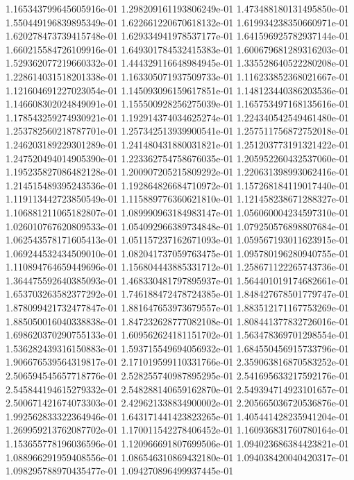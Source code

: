 1.165343799645605916e-01
1.298209161193806249e-01
1.473488180131495850e-01
1.550449196839895349e-01
1.622661220670618132e-01
1.619934238350660971e-01
1.620278473739415748e-01
1.629334941978537177e-01
1.641596925782937144e-01
1.660215584726109916e-01
1.649301784532415383e-01
1.600679681289316203e-01
1.529362077219660332e-01
1.444329116648984945e-01
1.335528640522280208e-01
1.228614031518201338e-01
1.163305071937509733e-01
1.116233852368021667e-01
1.121604691227023054e-01
1.145093096159617851e-01
1.148123440386203536e-01
1.146608302024849091e-01
1.155500928256275039e-01
1.165753497168135616e-01
1.178543259274930921e-01
1.192914374034625274e-01
1.224340542549461480e-01
1.253782560218787701e-01
1.257342513939900541e-01
1.257511756872752018e-01
1.246203189229301289e-01
1.241480431880031821e-01
1.251203773191321422e-01
1.247520494014905390e-01
1.223362754758676035e-01
1.205952260432537060e-01
1.195235827086482128e-01
1.200907205215809292e-01
1.220631398993062416e-01
1.214515489395243536e-01
1.192864826684710972e-01
1.157268184119017440e-01
1.119113442723850549e-01
1.115889776360621810e-01
1.121458238671288327e-01
1.106881211065182807e-01
1.089990963184983147e-01
1.056060004234597310e-01
1.026010767620809533e-01
1.054092966389734848e-01
1.079250576898807684e-01
1.062543578171605413e-01
1.051157237162671093e-01
1.059567193011623915e-01
1.069244532434509010e-01
1.082041737059763475e-01
1.095780196280940755e-01
1.110894764659449696e-01
1.156804443885331712e-01
1.258671122265743736e-01
1.364475592640385093e-01
1.468330481797895937e-01
1.564401019174682661e-01
1.653703263582377292e-01
1.746188472478724385e-01
1.848427678501779747e-01
1.878099421732477847e-01
1.881647653973679557e-01
1.883512171167753269e-01
1.885050016040338838e-01
1.847232628777082108e-01
1.808441377832726016e-01
1.698620370290755133e-01
1.609562624181151702e-01
1.563478369701298554e-01
1.536282439316150883e-01
1.593715549694056932e-01
1.684550456915733796e-01
1.906676539564319817e-01
2.171019599110331766e-01
2.359063816870583252e-01
2.506594545657718776e-01
2.528255740987895295e-01
2.541695633217592176e-01
2.545844194615279332e-01
2.548288140659162870e-01
2.549394714923101657e-01
2.500671421674073303e-01
2.429621338834900002e-01
2.205665036720536876e-01
1.992562833322364946e-01
1.643171441423823265e-01
1.405441428235941204e-01
1.269959213762087702e-01
1.170011542278406452e-01
1.160936831760780164e-01
1.153655778196036596e-01
1.120966691807699506e-01
1.094023686384423821e-01
1.088966291959408556e-01
1.086546310869432180e-01
1.094038420040420317e-01
1.098295788970435477e-01
1.094270896499937445e-01
